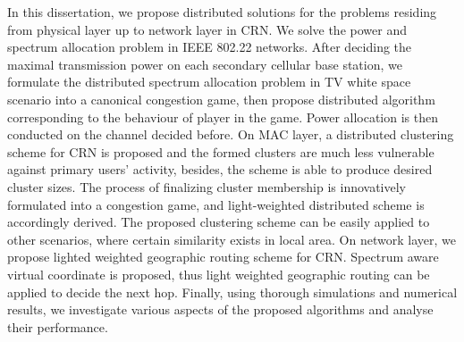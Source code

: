 In this dissertation, we propose distributed solutions for the problems residing from physical layer up to network layer in CRN. 
%
We solve the power and spectrum allocation problem in IEEE 802.22 networks.
After deciding the maximal transmission power on each secondary cellular base station, we formulate the distributed spectrum allocation problem in TV white space scenario into a canonical congestion game, then propose distributed algorithm corresponding to the behaviour of player in the game.
Power allocation is then conducted on the channel decided before.
%
On MAC layer, a distributed clustering scheme for CRN is proposed and the formed clusters are much less vulnerable against primary users' activity, besides, the scheme is able to produce desired cluster sizes.
The process of finalizing cluster membership is innovatively formulated into a congestion game, and light-weighted distributed scheme is accordingly derived.
The proposed clustering scheme can be easily applied to other scenarios, where certain similarity exists in local area.
%
On network layer, we propose lighted weighted geographic routing scheme for CRN. 
Spectrum aware virtual coordinate is proposed, thus light weighted geographic routing can be applied to decide the next hop.
%
Finally, using thorough simulations and numerical results, we investigate various aspects of the proposed algorithms and analyse their performance.


